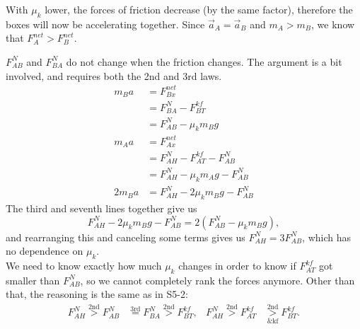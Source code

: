 \documentclass[]{article}
\begin{document}
\begin{TeacherMargin}
\noindent With $\mu_{k}$ lower, the forces of friction decrease (by the same factor), therefore the boxes will now be accelerating together. Since $\vec{a}_{A} = \vec{a}_{B}$ and $m_{A} > m_{B}$, we know that $F^{net}_{A} > F^{net}_{B}$.
\begin{center}
\end{center}
$F^{N}_{AB}$ and $F^{N}_{BA}$ do not change when the friction changes. The argument is a bit involved, and requires both the 2nd and 3rd laws.
\begin{align*}
	m_{B}a & = F^{net}_{Bx} \\
	& = F^{N}_{BA}-F^{kf}_{BT} \\
	& = F^{N}_{AB}-\mu_{k}m_{B}g \\
	m_{A}a & = F^{net}_{Ax} \\
	& = F^{N}_{AH}-F^{kf}_{AT}-F^{N}_{AB} \\
	& = F^{N}_{AH}-\mu_{k}m_{A}g-F^{N}_{AB} \\
	2m_{B}a & = F^{N}_{AH}-2\mu_{k}m_{B}g-F^{N}_{AB}
\end{align*}
The third and seventh lines together give us
\[
F^{N}_{AH}-2\mu_{k}m_{B}g-F^{N}_{AB} = 2(F^{N}_{AB}-\mu_{k}m_{B}g),
\]
and rearranging this and canceling some terms gives us $F^{N}_{AH} = 3F^{N}_{AB}$, which has no dependence on $\mu_{k}$. \\

\noindent We need to know exactly how much $\mu_{k}$ changes in order to know if $F^{kf}_{AT}$ got smaller than $F^{N}_{AB}$, so we cannot completely rank the forces anymore. Other than that, the reasoning is the same as in S5-2:
\begin{align*}
	F^{N}_{AH} \overset{\text{2nd}}{>} F^{N}_{AB} & \overset{\text{3rd}}{=} F^{N}_{BA} \overset{\text{2nd}}{>} F^{kf}_{BT}, & F^{N}_{AH} \overset{\text{2nd}}{>} F^{kf}_{AT} & \underset{\text{\& kf}}{\overset{\text{2nd}}{>}} F^{kf}_{BT}.
\end{align*}
\end{TeacherMargin}
\end{document}

